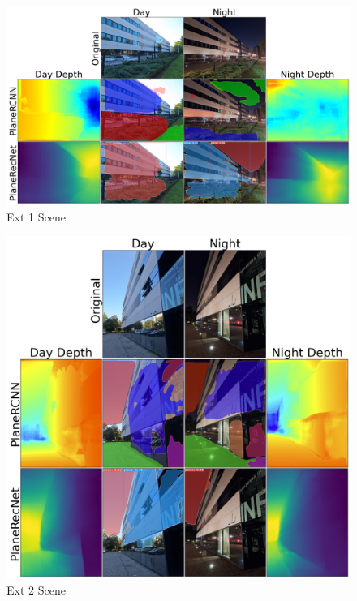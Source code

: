 \begin{figure}[H]
    \centering
    \includegraphics[width=1.0\textwidth]{images/results/Ext_1.png}
    \caption{Ext 1 Scene}
    \label{figure:Ext_1}
\end{figure}

\begin{figure}[H]
    \centering
    \includegraphics[width=1.0\textwidth]{images/results/Ext_2.png}
    \caption{Ext 2 Scene}
    \label{figure:Ext_2}
\end{figure}

